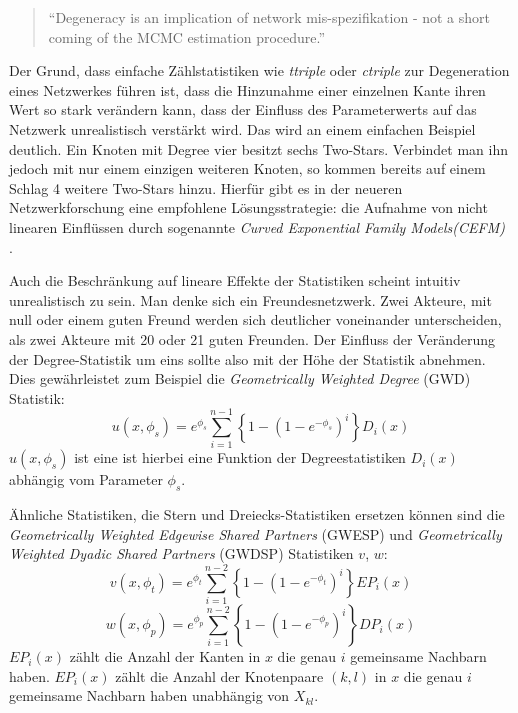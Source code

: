 \documentclass[a4paper,ngerman,oneside,titlepage,bibliography=totoc,11pt]{scrreprt}
\begin{document}
\begin{quote}
"`Degeneracy is an implication of network mis-spezifikation - not a short coming of the MCMC estimation procedure."'\citep{handcock2008statnet}
\end{quote}

Der Grund, dass einfache Zählstatistiken wie \textit{ttriple} oder \textit{ctriple} zur Degeneration eines Netzwerkes führen ist, dass die Hinzunahme einer einzelnen Kante ihren Wert so stark verändern kann, dass der Einfluss des Parameterwerts auf das Netzwerk unrealistisch verstärkt wird. Das wird an einem einfachen Beispiel deutlich. Ein Knoten mit Degree vier besitzt sechs Two-Stars. Verbindet man ihn jedoch mit nur einem einzigen weiteren Knoten, so kommen bereits auf einem Schlag 4 weitere Two-Stars hinzu. Hierfür gibt es in der neueren Netzwerkforschung eine empfohlene Lösungsstrategie: die Aufnahme von nicht linearen Einflüssen durch sogenannte \emph{Curved Exponential Family Models(CEFM)} \citep{hunter2007curved}.

Auch die Beschränkung auf lineare Effekte der Statistiken scheint intuitiv unrealistisch zu sein. Man denke sich ein Freundesnetzwerk. Zwei Akteure, mit null oder einem guten Freund werden sich deutlicher voneinander unterscheiden, als zwei Akteure mit 20 oder 21 guten Freunden. Der Einfluss der Veränderung der Degree-Statistik um eins sollte also mit der Höhe der Statistik abnehmen. Dies gewährleistet zum Beispiel die \textit{Geometrically Weighted Degree} (GWD) Statistik:
\begin{equation}
	u(x, \phi_s) = e^{\phi_s} \sum^{n-1}_{i=1}\left\{1-(1-e^{-\phi_s})^{i}\right\}D_i(x)
	\label{eq:GWD}
\end{equation}
$u(x,\phi_s)$ ist eine ist hierbei eine Funktion der Degreestatistiken $D_i(x)$ abhängig vom Parameter $\phi_s$.

Ähnliche Statistiken, die Stern und Dreiecks-Statistiken ersetzen können sind die \textit{Geometrically Weighted Edgewise Shared Partners} (GWESP) und \textit{Geometrically Weighted Dyadic Shared Partners} (GWDSP) Statistiken $v$, $w$:
\begin{equation}
	v(x, \phi_t) = e^{\phi_t} \sum^{n-2}_{i=1}\left\{1-(1-e^{-\phi_t})^{i}\right\}EP_i(x)
	\label{eq:GWESP}
\end{equation}
\begin{equation}
	w(x, \phi_p) = e^{\phi_p} \sum^{n-2}_{i=1}\left\{1-(1-e^{-\phi_p})^{i}\right\}DP_i(x)
	\label{eq:GWDSP}
\end{equation}
$EP_i(x)$ zählt die Anzahl der Kanten in $x$ die genau $i$ gemeinsame Nachbarn haben. $EP_i(x)$ zählt die Anzahl der Knotenpaare $(k,l)$ in $x$ die genau $i$ gemeinsame Nachbarn haben unabhängig von $X_{kl}$.
\end{document}
